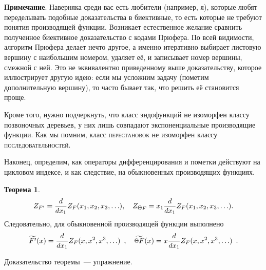 \documentclass[a5paper]{article}
\def \point {\raisebox{.1\height}{\scalebox{0.8}{$\Theta$}}}
\theoremstyle{definition}
\newtheorem*{theorem}{Теорема}
\begin{document}
{\footnotesize
\textbf{Примечание}. Наверняка среди вас есть любители (например, я), которые
любят переделывать подобные доказательства в биективные, то есть которые не
требуют понятия производящей функции. Возникает естественное желание сравнить
полученное биективное доказательство с кодами Прюфера. По всей видимости,
алгоритм Прюфера делает нечто другое, а именно итеративно выбирает листовую вершину с
наибольшим номером, удаляет её, и записывает номер вершины, смежной с ней. Это
не эквивалентно приведенному выше доказательству, которое иллюстрирует другую
идею: если мы усложним задачу (пометим дополнительную вершину), то часто бывает
так, что решить её становится проще.

Кроме того, нужно подчеркнуть, что класс эндофункций не изоморфен классу
позвоночных деревьев, у них лишь совпадают экспоненциальные производящие
функции. Как мы помним, класс
\textsc{перестановок} не изоморфен классу \textsc{последовательностей}.}

Наконец, определим, как операторы дифференцирования и пометки действуют на
цикловом индексе, и как следствие, на обыкновенных производящих функциях.
\begin{theorem}
\[
    Z_{F'} = \dfrac{d}{dx_1} Z_F(x_1, x_2, x_3, \ldots), \quad
    Z_{\point F} = x_1 \dfrac{d}{d x_1} Z_F(x_1, x_2, x_3, \ldots). 
\]
Следовательно, для обыкновенной производящей функции выполнено
\[
    \widetilde{F'}(x) = \dfrac{d}{dx_1} Z_F(x, x^2, x^3, \ldots)\enspace ,
\quad
    \widetilde{\point F}(x) = x \dfrac{d}{dx_1} Z_F(x, x^2, x^3, \ldots)
\enspace .
\]
\end{theorem}
Доказательство теоремы~--- упражнение.
\end{document}
